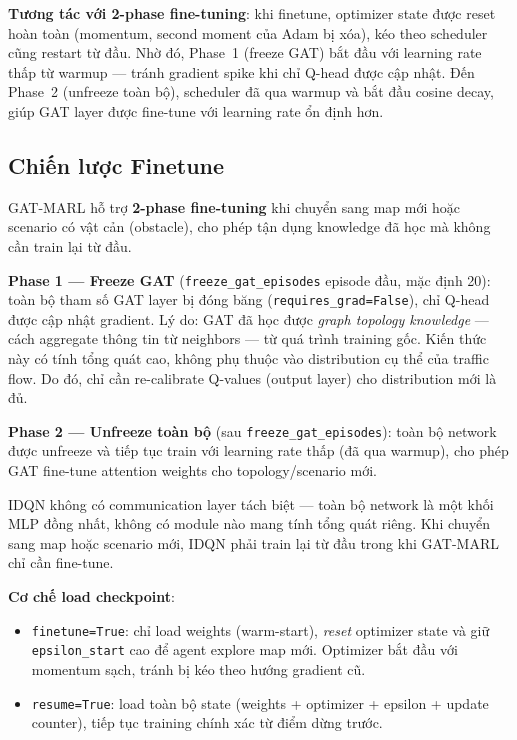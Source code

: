\documentclass[conference]{IEEEtran}
\begin{document}
\textbf{Tương tác với 2-phase fine-tuning}: khi finetune, optimizer state được reset hoàn toàn (momentum, second moment của Adam bị xóa), kéo theo scheduler cũng restart từ đầu. Nhờ đó, Phase~1 (freeze GAT) bắt đầu với learning rate thấp từ warmup --- tránh gradient spike khi chỉ Q-head được cập nhật. Đến Phase~2 (unfreeze toàn bộ), scheduler đã qua warmup và bắt đầu cosine decay, giúp GAT layer được fine-tune với learning rate ổn định hơn.

\subsection{Chiến lược Finetune}
\label{sec:finetune}

GAT-MARL hỗ trợ \textbf{2-phase fine-tuning} khi chuyển sang map mới hoặc scenario có vật cản (obstacle), cho phép tận dụng knowledge đã học mà không cần train lại từ đầu.

\textbf{Phase 1 --- Freeze GAT} (\texttt{freeze\_gat\_episodes} episode đầu, mặc định 20): toàn bộ tham số GAT layer bị đóng băng (\texttt{requires\_grad=False}), chỉ Q-head được cập nhật gradient. Lý do: GAT đã học được \textit{graph topology knowledge} --- cách aggregate thông tin từ neighbors --- từ quá trình training gốc. Kiến thức này có tính tổng quát cao, không phụ thuộc vào distribution cụ thể của traffic flow. Do đó, chỉ cần re-calibrate Q-values (output layer) cho distribution mới là đủ.

\textbf{Phase 2 --- Unfreeze toàn bộ} (sau \texttt{freeze\_gat\_episodes}): toàn bộ network được unfreeze và tiếp tục train với learning rate thấp (đã qua warmup), cho phép GAT fine-tune attention weights cho topology/scenario mới.

IDQN không có communication layer tách biệt --- toàn bộ network là một khối MLP đồng nhất, không có module nào mang tính tổng quát riêng. Khi chuyển sang map hoặc scenario mới, IDQN phải train lại từ đầu trong khi GAT-MARL chỉ cần fine-tune.

\textbf{Cơ chế load checkpoint}:
\begin{itemize}[leftmargin=*]
    \item \texttt{finetune=True}: chỉ load weights (warm-start), \textit{reset} optimizer state và giữ \texttt{epsilon\_start} cao để agent explore map mới. Optimizer bắt đầu với momentum sạch, tránh bị kéo theo hướng gradient cũ.
    \item \texttt{resume=True}: load toàn bộ state (weights + optimizer + epsilon + update counter), tiếp tục training chính xác từ điểm dừng trước.
\end{itemize}
\end{document}
